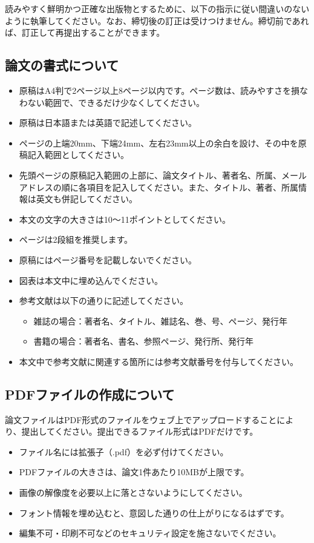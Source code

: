 \documentclass[a4paper,twocolumn,10pt]{jsarticle}
\begin{document}
読みやすく鮮明かつ正確な出版物とするために、以下の指示に従い間違いのないように執筆してください。なお、締切後の訂正は受けつけません。締切前であれば、訂正して再提出することができます。

\subsection{論文の書式について}
\begin{itemize}
	\item 原稿はA4判で2ページ以上8ページ以内です。ページ数は、読みやすさを損なわない範囲で、できるだけ少なくしてください。
	\item 原稿は日本語または英語で記述してください。
	\item ページの上端20mm、下端24mm、左右23mm以上の余白を設け、その中を原稿記入範囲としてください。
	\item 先頭ページの原稿記入範囲の上部に、論文タイトル、著者名、所属、メールアドレスの順に各項目を記入してください。また、タイトル、著者、所属情報は英文も併記してください。
	\item 本文の文字の大きさは10～11ポイントとしてください。
	\item ページは2段組を推奨します。
	\item 原稿にはページ番号を記載しないでください。
	\item 図表は本文中に埋め込んでください。
	\item 参考文献は以下の通りに記述してください。
	\begin{itemize}
		\item	雑誌の場合：著者名、タイトル、雑誌名、巻、号、ページ、発行年
		\item	書籍の場合：著者名、書名、参照ページ、発行所、発行年
	\end{itemize}
	\item	本文中で参考文献に関連する箇所には参考文献番号を付与してください。
\end{itemize}

\subsection{PDFファイルの作成について}

論文ファイルはPDF形式のファイルをウェブ上でアップロードすることにより、提出してください。提出できるファイル形式はPDFだけです。
\begin{itemize}
	\item ファイル名には拡張子（.pdf）を必ず付けてください。
	\item PDFファイルの大きさは、論文1件あたり10MBが上限です。
	\item 画像の解像度を必要以上に落とさないようにしてください。
	\item フォント情報を埋め込むと、意図した通りの仕上がりになるはずです。
	\item 編集不可・印刷不可などのセキュリティ設定を施さないでください。
\end{itemize}
\end{document}
